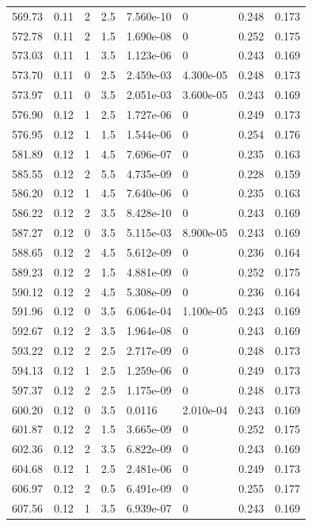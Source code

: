 \documentclass[preview]{standalone}
\begin{document}
{{{{{{{{{{\begin{tabular}{L{1.2cm}C{1.2cm} C{0.3cm}C{0.5cm} C{1.4cm}C{1.4cm} C{1.4cm}C{1.4cm}}
  569.73  &  0.11  & 2     & 2.5 &  7.560e-10  & 0  & 0.248 &  0.173   \\ 
  572.78  &  0.11  & 2     & 1.5 &  1.690e-08  & 0  & 0.252 &  0.175   \\ 
  573.03  &  0.11  & 1     & 3.5 &  1.123e-06  & 0  & 0.243 &  0.169   \\ 
  573.70  &  0.11  & 0     & 2.5 &  2.459e-03  & 4.300e-05  & 0.248 &  0.173   \\ 
  573.97  &  0.11  & 0     & 3.5 &  2.051e-03  & 3.600e-05  & 0.243 &  0.169   \\ 
  576.90  &  0.12  & 1     & 2.5 &  1.727e-06  & 0  & 0.249 &  0.173   \\ 
  576.95  &  0.12  & 1     & 1.5 &  1.544e-06  & 0  & 0.254 &  0.176   \\ 
  581.89  &  0.12  & 1     & 4.5 &  7.696e-07  & 0  & 0.235 &  0.163   \\ 
  585.55  &  0.12  & 2     & 5.5 &  4.735e-09  & 0  & 0.228 &  0.159   \\ 
  586.20  &  0.12  & 1     & 4.5 &  7.640e-06  & 0  & 0.235 &  0.163   \\ 
  586.22  &  0.12  & 2     & 3.5 &  8.428e-10  & 0  & 0.243 &  0.169   \\ 
  587.27  &  0.12  & 0     & 3.5 &  5.115e-03  & 8.900e-05  & 0.243 &  0.169   \\ 
  588.65  &  0.12  & 2     & 4.5 &  5.612e-09  & 0  & 0.236 &  0.164   \\ 
  589.23  &  0.12  & 2     & 1.5 &  4.881e-09  & 0  & 0.252 &  0.175   \\ 
  590.12  &  0.12  & 2     & 4.5 &  5.308e-09  & 0  & 0.236 &  0.164   \\ 
  591.96  &  0.12  & 0     & 3.5 &  6.064e-04  & 1.100e-05  & 0.243 &  0.169   \\ 
  592.67  &  0.12  & 2     & 3.5 &  1.964e-08  & 0  & 0.243 &  0.169   \\ 
  593.22  &  0.12  & 2     & 2.5 &  2.717e-09  & 0  & 0.248 &  0.173   \\ 
  594.13  &  0.12  & 1     & 2.5 &  1.259e-06  & 0  & 0.249 &  0.173   \\ 
  597.37  &  0.12  & 2     & 2.5 &  1.175e-09  & 0  & 0.248 &  0.173   \\ 
  600.20  &  0.12  & 0     & 3.5 &  0.0116  & 2.010e-04  & 0.243 &  0.169   \\ 
  601.87  &  0.12  & 2     & 1.5 &  3.665e-09  & 0  & 0.252 &  0.175   \\ 
  602.36  &  0.12  & 2     & 3.5 &  6.822e-09  & 0  & 0.243 &  0.169   \\ 
  604.68  &  0.12  & 1     & 2.5 &  2.481e-06  & 0  & 0.249 &  0.173   \\ 
  606.97  &  0.12  & 2     & 0.5 &  6.491e-09  & 0  & 0.255 &  0.177   \\ 
  607.56  &  0.12  & 1     & 3.5 &  6.939e-07  & 0  & 0.243 &  0.169   \\ 
\hline 
\end{tabular} 

}}}}}}}}}}
\end{document}
